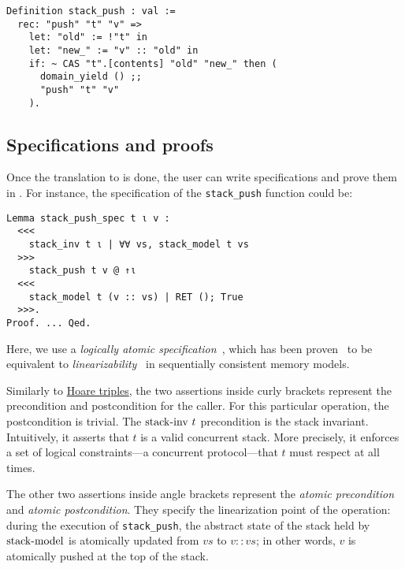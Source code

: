 \begin{verbatim}
Definition stack_push : val :=
  rec: "push" "t" "v" =>
    let: "old" := !"t" in
    let: "new_" := "v" :: "old" in
    if: ~ CAS "t".[contents] "old" "new_" then (
      domain_yield () ;;
      "push" "t" "v"
    ).
\end{verbatim}

\subsection{Specifications and proofs}

Once the translation to \ZooLang is done, the user can write specifications and prove them in \Iris.
For instance, the specification of the \texttt{stack_push} function could be:

\begin{verbatim}
Lemma stack_push_spec t ι v :
  <<<
    stack_inv t ι | ∀∀ vs, stack_model t vs
  >>>
    stack_push t v @ ↑ι
  <<<
    stack_model t (v :: vs) | RET (); True
  >>>.
Proof. ... Qed.
\end{verbatim}

Here, we use a \emph{logically atomic specification}~\cite{DBLP:conf/ecoop/PintoDG14}, which has been proven~\cite{DBLP:journals/pacmpl/BirkedalDGJST21} to be equivalent to \emph{linearizability}~\cite{DBLP:journals/toplas/HerlihyW90} in sequentially consistent memory models.

Similarly to \href{https://en.wikipedia.org/wiki/Hoare_logic}{Hoare triples}, the two assertions inside curly brackets represent the precondition and postcondition for the caller.
For this particular operation, the postcondition is trivial.
The $\mathrm{stack {\hbox{-}} inv}\ t$ precondition is the stack invariant.
Intuitively, it asserts that $t$ is a valid concurrent stack.
More precisely, it enforces a set of logical constraints---a concurrent protocol---that $t$ must respect at all times.

The other two assertions inside angle brackets represent the \emph{atomic precondition} and \emph{atomic postcondition}.
They specify the linearization point of the operation: during the execution of \texttt{stack\_push}, the abstract state of the stack held by $\mathrm{stack {\hbox{-}} model}$ is atomically updated from $\mathit{vs}$ to $v :: \mathit{vs}$; in other words, $v$ is atomically pushed at the top of the stack.
